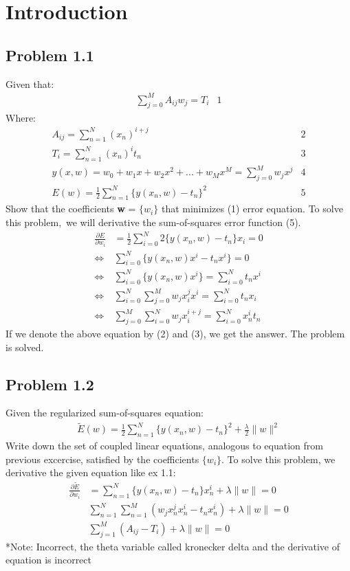 \documentclass[12pt]{article}
\begin{document}
    \section{Introduction}
    \subsection*{Problem 1.1}
    Given that:
    \begin{align}
        \sum^M_{j = 0}A_{ij}w_j = T_i & \text{1}
    \end{align}
    Where:
    \begin{align*}
        A_{ij} = \sum^N_{n = 1}(x_n)^{i+j} &\text{2}\\
        T_i = \sum^N_{n = 1}(x_n)^it_n & \text{3}\\
        y(x,w) = w_0 + w_1x + w_2x^2 + ... + w_Mx^M = \sum^M_{j = 0}w_jx^j & \text{4}\\
        E(w) = \frac{1}{2}\sum^N_{n = 1}\{y(x_n,w) - t_n\}^2 & \text{5}
    \end{align*}
    Show that the coefficients \textbf{w} = $\{w_i\}$ that minimizes (1) error equation. To solve this problem,\
    we will derivative the sum-of-squares error function (5).
    \begin{align*}
        \frac{\partial E}{\partial w_i} & = \frac{1}{2}\sum^N_{i = 0}2\{y(x_n,w)-t_n\}x_i = 0\\
        \iff & \sum^N_{i = 0}\{y(x_n,w)x^i - t_nx^i\} = 0 \\
        \iff & \sum^N_{i = 0}\{y(x_n,w)x^i\} = \sum^N_{i = 0}t_nx^i \\
        \iff & \sum^N_{i = 0}\sum^M_{j = 0}w_jx_i^jx^i = \sum^N_{i = 0}t_nx_i \\
        \iff & \sum^M_{j = 0}\sum^N_{i = 0}w_jx_i^{i+j} = \sum^N_{i = 0}x_n^it_n
    \end{align*}
    If we denote the above equation by (2) and (3), we get the answer. The problem is solved.
    
    \subsection*{Problem 1.2}
    Given the regularized sum-of-squares equation:
    \begin{align}
        \tilde{E}(w) = \frac{1}{2}\sum^N_{n = 1}\{y(x_n,w)-t_n\}^2 + \frac{\lambda}{2}\|w\|^2
    \end{align}
    Write down the set of coupled linear equations, analogous to equation from previous excercise, satisfied by the coefficients $\{w_i\}$.
    To solve this problem, we derivative the given equation like ex 1.1:
    \begin{align*}
        \frac{\partial \tilde{E}}{\partial w_i} & = \sum^{N}_{n = 1}\{y(x_n,w) - t_n\}x_n^i + \lambda\|w\| = 0 \\
        & \sum^N_{n = 1}\sum^{M}_{n = 1}(w_jx_n^jx_n^i - t_nx_n^i) + \lambda\|w\| = 0 \\
        & \sum^M_{j = 1}(A_{ij} - T_i) + \lambda\|w\| = 0
    \end{align*}
    *Note: Incorrect, the theta variable called kronecker delta and the derivative of equation is incorrect
\end{document}
